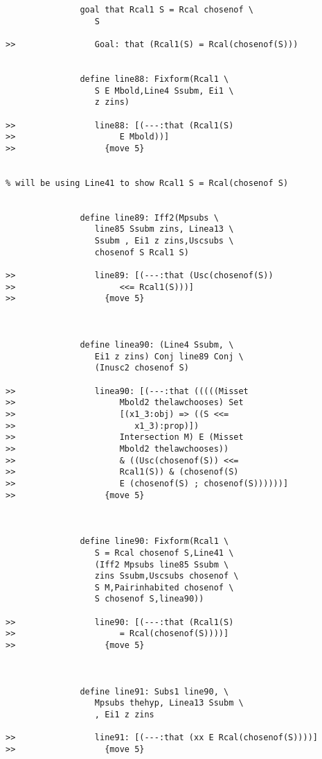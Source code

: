 \documentclass[12pt]{article}
\begin{document}
\begin{verbatim}
               goal that Rcal1 S = Rcal chosenof \
                  S

>>                Goal: that (Rcal1(S) = Rcal(chosenof(S)))


               define line88: Fixform(Rcal1 \
                  S E Mbold,Line4 Ssubm, Ei1 \
                  z zins)

>>                line88: [(---:that (Rcal1(S)
>>                     E Mbold))]
>>                  {move 5}


% will be using Line41 to show Rcal1 S = Rcal(chosenof S)


               define line89: Iff2(Mpsubs \
                  line85 Ssubm zins, Linea13 \
                  Ssubm , Ei1 z zins,Uscsubs \
                  chosenof S Rcal1 S)

>>                line89: [(---:that (Usc(chosenof(S))
>>                     <<= Rcal1(S)))]
>>                  {move 5}



               define linea90: (Line4 Ssubm, \
                  Ei1 z zins) Conj line89 Conj \
                  (Inusc2 chosenof S)

>>                linea90: [(---:that (((((Misset
>>                     Mbold2 thelawchooses) Set
>>                     [(x1_3:obj) => ((S <<=
>>                        x1_3):prop)])
>>                     Intersection M) E (Misset
>>                     Mbold2 thelawchooses))
>>                     & ((Usc(chosenof(S)) <<=
>>                     Rcal1(S)) & (chosenof(S)
>>                     E (chosenof(S) ; chosenof(S))))))]
>>                  {move 5}



               define line90: Fixform(Rcal1 \
                  S = Rcal chosenof S,Line41 \
                  (Iff2 Mpsubs line85 Ssubm \
                  zins Ssubm,Uscsubs chosenof \
                  S M,Pairinhabited chosenof \
                  S chosenof S,linea90))

>>                line90: [(---:that (Rcal1(S)
>>                     = Rcal(chosenof(S))))]
>>                  {move 5}



               define line91: Subs1 line90, \
                  Mpsubs thehyp, Linea13 Ssubm \
                  , Ei1 z zins

>>                line91: [(---:that (xx E Rcal(chosenof(S))))]
>>                  {move 5}




\end{verbatim}
\end{document}
